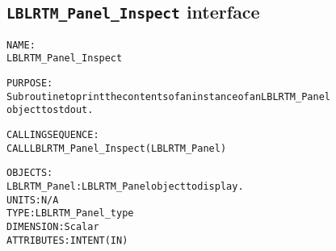\subsection{\texttt{LBLRTM\_Panel\_Inspect} interface}
  \label{sec:LBLRTM_Panel_Inspect_interface}
  \begin{alltt}
 
  NAME:
        LBLRTM_Panel_Inspect
 
  PURPOSE:
        Subroutine to print the contents of an instance of an LBLRTM_Panel
        object to stdout.
 
  CALLING SEQUENCE:
        CALL LBLRTM_Panel_Inspect( LBLRTM_Panel )
 
  OBJECTS:
        LBLRTM_Panel:  LBLRTM_Panel object to display.
                       UNITS:      N/A
                       TYPE:       LBLRTM_Panel_type
                       DIMENSION:  Scalar
                       ATTRIBUTES: INTENT(IN)
 
  \end{alltt}
